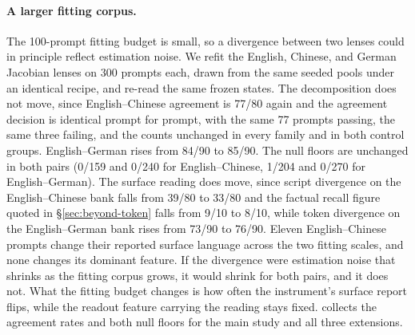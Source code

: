 \paragraph{A larger fitting corpus.}
The 100-prompt fitting budget is small, so a divergence between two
lenses could in principle reflect estimation noise. We refit the English, Chinese, and German
Jacobian lenses on 300 prompts each, drawn from the same seeded pools
under an identical recipe, and re-read the same frozen states. The
decomposition does not move, since English--Chinese agreement is 77/80
again and the agreement decision is identical prompt for prompt, with the
same 77 prompts passing, the same three failing, and the counts unchanged
in every family and in both control groups. English--German rises from 84/90 to
85/90. The null floors are unchanged in both pairs (0/159 and 0/240 for
English--Chinese, 1/204 and 0/270 for English--German). The surface reading
does move, since script divergence on the
English--Chinese bank falls from 39/80 to 33/80 and the factual recall
figure quoted in \S\ref{sec:beyond-token} falls from 9/10 to 8/10, while
token divergence on the English--German bank rises from 73/90 to 76/90.
Eleven English--Chinese prompts change their reported surface language
across the two fitting scales, and none changes its dominant feature. If
the divergence were estimation noise that shrinks as the fitting corpus
grows, it would shrink for both pairs, and it does not. What the fitting
budget changes is how often the instrument's surface report flips, while
the readout feature carrying the reading stays fixed.
 collects the agreement rates and both
null floors for the main study and all three extensions.

